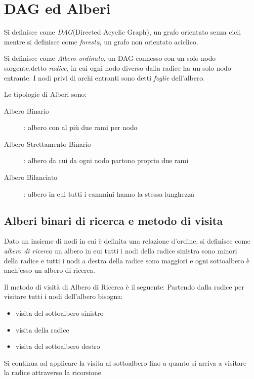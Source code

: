 \section{DAG ed Alberi}
Si definisce come \emph{DAG}(Directed Acyclic Graph), un grafo orientato senza cicli
mentre si definisce come \emph{foresta}, un grafo non orientato aciclico.

Si definisce come \emph{Albero ordinato}, un DAG connesso con un solo nodo sorgente,detto \emph{radice},
in cui ogni nodo diverso dalla radice ha un solo nodo entrante.\newline
I nodi privi di archi entranti sono detti \emph{foglie} dell'albero.


Le tipologie di Alberi sono:
\begin{description}
    \item[Albero Binario]: albero con al più due rami per nodo
    \item[Albero Strettamento Binario]: albero da cui da ogni nodo partono proprio due rami
    \item[Albero Bilanciato]: albero in cui tutti i cammini hanno la stessa lunghezza
\end{description}



\subsection{Alberi binari di ricerca e metodo di visita}
Dato un insieme di nodi in cui è definita una relazione d'ordine, si definisce come
\emph{albero di ricerca} un albero in cui tutti i nodi della radice sinistra sono
minori della radice e tutti i nodi a destra della radice sono maggiori e ogni sottoalbero
è anch'esso un albero di ricerca.


Il metodo di visità di Albero di Ricerca è il seguente:\newline
Partendo dalla radice per visitare tutti i nodi dell'albero bisogna:
\begin{itemize}
    \item visita del sottoalbero sinistro
    \item visita della radice
    \item visita del sottoalbero destro
\end{itemize}
Si continua ad applicare la visita al sottoalbero fino a quanto si arriva a visitare la radice
attraverso la ricorsione

